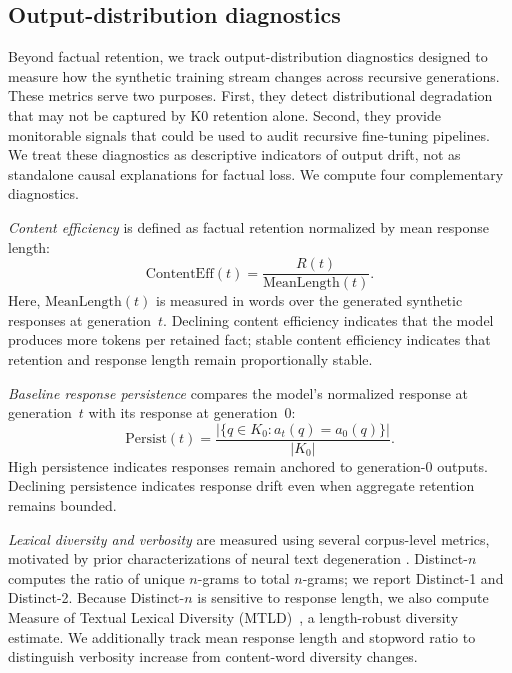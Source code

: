 \documentclass[a4paper,fleqn]{cas-dc}
\newif\ifshowchanges
\newcommand{\rev}[1]{\ifshowchanges{\color{blue}#1}\else{#1}\fi}
\begin{document}
\subsection{Output-distribution diagnostics}\label{sec:metrics}

Beyond factual retention, we track output-distribution diagnostics designed to
measure how the synthetic training stream changes across recursive generations.
These metrics serve two purposes. First, they detect distributional degradation
that may not be captured by K0 retention alone. Second, they provide monitorable
signals that could be used to audit recursive fine-tuning pipelines. We treat
these diagnostics as descriptive indicators of output drift, not as standalone
causal explanations for factual loss. We compute four complementary diagnostics.

\textit{Content efficiency} is defined as factual retention normalized by mean
response length:
\begin{equation}\label{eq:efficiency}
    \mathrm{ContentEff}(t) =
    \frac{\rev{R(t)}}{\mathrm{MeanLength}(t)}.
\end{equation}
Here, $\mathrm{MeanLength}(t)$ is measured in words over the generated synthetic
responses at generation~$t$. Declining content efficiency indicates that the
model produces more tokens per retained fact; stable content efficiency indicates
that retention and response length remain proportionally stable.

\textit{Baseline response persistence} compares the model's normalized response
at generation~$t$ with its response at generation~0:
\begin{equation}\label{eq:persistence}
    \mathrm{Persist}(t) =
    \frac{|\{q \in K_0 : a_t(q) = a_0(q)\}|}{|K_0|}.
\end{equation}
High persistence indicates responses remain anchored to generation-0 outputs.
Declining persistence indicates response drift even when aggregate retention
remains bounded.

\textit{Lexical diversity and verbosity} are measured using several corpus-level
metrics, motivated by prior characterizations of neural text degeneration
\citep{holtzman2020}. Distinct-$n$~\citep{li2016} computes the ratio of unique
$n$-grams to
total $n$-grams; we report Distinct-1 and Distinct-2. Because Distinct-$n$ is
sensitive to response length, we also compute
\rev{Measure of Textual Lexical Diversity (MTLD)}~\citep{mccarthy2010}, a length-robust diversity estimate. We additionally
track mean response length and stopword ratio to distinguish verbosity increase
from content-word diversity changes.
\end{document}

